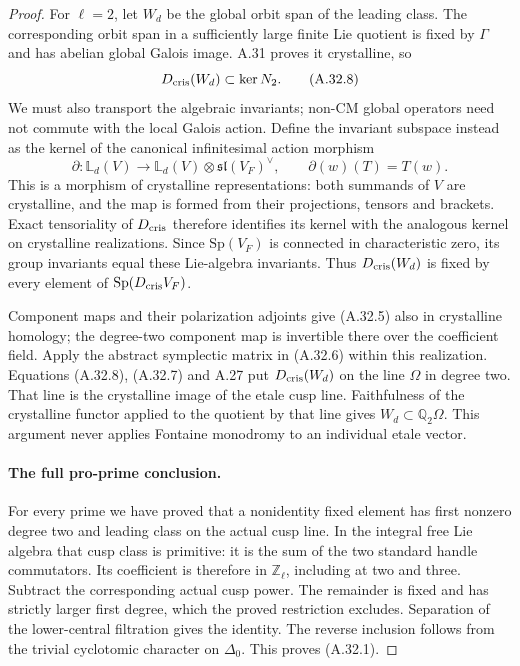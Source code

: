 \begin{proof}
For \(\ell=2\), let \(W_d\) be the global orbit
span of the leading class. The corresponding orbit
span in a sufficiently large finite Lie quotient
is fixed by \(\Gamma\) and has abelian global
Galois image. A.31 proves it crystalline, so
\[
                    D_{\rm cris}(W_d)\subset\ker N_2.
                                                        \tag{A.32.8}
\]
We must also transport the algebraic invariants;
non-CM global operators need not commute with the
local Galois action. Define the invariant subspace
instead as the kernel of the canonical infinitesimal
action morphism
\[
 \partial:\mathbb L_d(V)\longrightarrow
       \mathbb L_d(V)\otimes\mathfrak{sl}(V_F)^\vee,
              \qquad \partial(w)(T)=T(w).                \tag{A.32.9}
\]
This is a morphism of crystalline representations:
both summands of \(V\) are crystalline, and the
map is formed from their projections, tensors and
brackets. Exact tensoriality of \(D_{\rm cris}\)
therefore identifies its kernel with the analogous
kernel on crystalline realizations. Since
\(\mathrm{Sp}(V_F)\) is connected in characteristic
zero, its group invariants equal these Lie-algebra
invariants. Thus \(D_{\rm cris}(W_d)\) is fixed
by every element of
\(\mathrm{Sp}(D_{\rm cris}V_F)\).

Component maps and their polarization adjoints
give (A.32.5) also in crystalline homology; the
degree-two component map is invertible there
over the coefficient field. Apply the abstract
symplectic matrix in (A.32.6) within this
realization. Equations (A.32.8), (A.32.7) and
A.27 put \(D_{\rm cris}(W_d)\) on the line
\(\Omega\) in degree two. That line is the
crystalline image of the etale cusp line.
Faithfulness of the crystalline functor applied
to the quotient by that line gives
\(W_d\subset\mathbb Q_2\Omega\).
This argument never applies Fontaine monodromy
to an individual etale vector.

\paragraph{The full pro-prime conclusion.}
For every prime we have proved that a nonidentity
fixed element has first nonzero degree two and
leading class on the actual cusp line. In the
integral free Lie algebra that cusp class is
primitive: it is the sum of the two standard
handle commutators. Its coefficient is therefore
in \(\mathbb Z_\ell\), including at two and three.
Subtract the corresponding actual cusp power.
The remainder is fixed and has strictly larger
first degree, which the proved restriction
excludes. Separation of the lower-central
filtration gives the identity. The reverse
inclusion follows from the trivial cyclotomic
character on \(\Delta_0\). This proves (A.32.1).
\end{proof}
